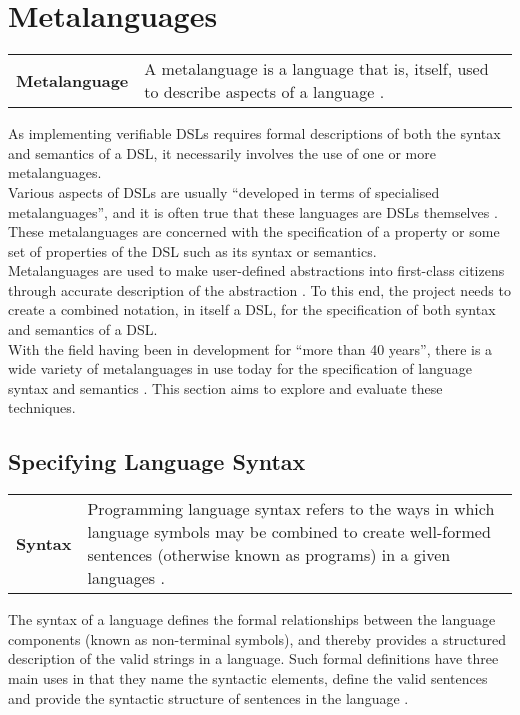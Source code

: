 \documentclass[a4paper,11pt]{report}
\newcommand{\defblock}[3]{
    \begin{longtable}{l p{#1}} 
        \textbf{#2} & #3
    \end{longtable}
}
\begin{document}
\section{Metalanguages} %
\label{sec:metalanguages}
\defblock{10.5cm}{Metalanguage}{A metalanguage is a language that is, itself, used to describe aspects of a language \citep{jakobson1980metalanguage}.}

As implementing verifiable DSLs requires formal descriptions of both the syntax and semantics of a DSL, it necessarily involves the use of one or more metalanguages. \\

Various aspects of DSLs are usually ``developed in terms of specialised metalanguages'', and it is often true that these languages are DSLs themselves \citep{Mernik:2005:DDL:1118890.1118892}.
These metalanguages are concerned with the specification of a property or some set of properties of the DSL such as its syntax or semantics. \\

Metalanguages are used to make user-defined abstractions into first-class citizens through accurate description of the abstraction \citep{Siek:2010:GPL:1706356.1706358}.
To this end, the project needs to create a combined notation, in itself a DSL, for the specification of both syntax and semantics of a DSL. \\

With the field having been in development for ``more than 40 years'', there is a wide variety of metalanguages in use today for the specification of language syntax and semantics \citep{Zhang:2004:SSD:981009.981013}. 
This section aims to explore and evaluate these techniques. 

\subsection{Specifying Language Syntax} %
\label{sub:specifying_language_syntax}
\defblock{11.8cm}{Syntax}{
    Programming language syntax refers to the ways in which language symbols may be combined to create well-formed sentences (otherwise known as programs) in a given languages \citep[pg. 1]{slonneger1995formal}.
}

The syntax of a language defines the formal relationships between the language components (known as non-terminal symbols), and thereby provides a structured description of the valid strings in a language. 
Such formal definitions have three main uses in that they name the syntactic elements, define the valid sentences and provide the syntactic structure of sentences in the language \citep{Scowen:1982:SSM:947912.947917,standard1996ebnf}.
\end{document}
